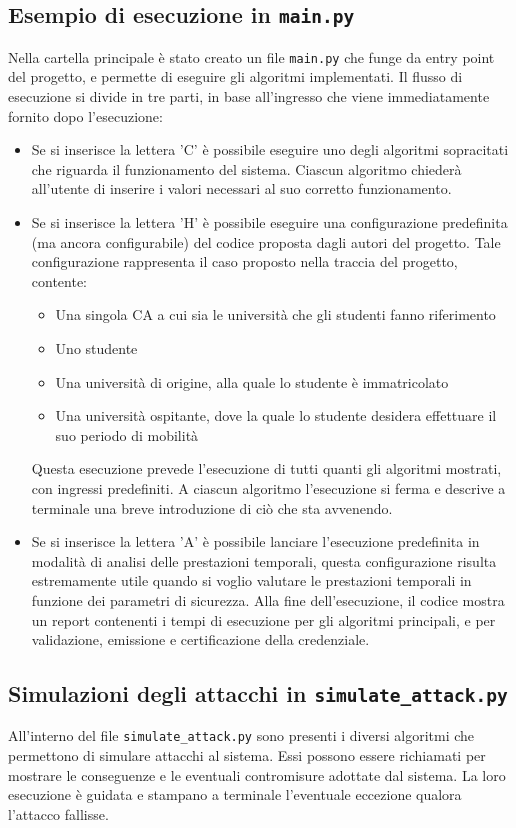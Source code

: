 \documentclass[a4paper,12pt]{article}
\begin{document}
\subsection{Esempio di esecuzione in \texttt{main.py}}
Nella cartella principale è stato creato un file \texttt{main.py} che funge da entry point del progetto, e permette di eseguire gli algoritmi implementati. Il flusso di esecuzione si divide in tre parti, in base all'ingresso che viene immediatamente fornito dopo l'esecuzione:
\begin{itemize}
    \item Se si inserisce la lettera 'C' è possibile eseguire uno degli algoritmi sopracitati che riguarda il funzionamento del sistema. Ciascun algoritmo chiederà all'utente di inserire i valori necessari al suo corretto funzionamento.
    \item Se si inserisce la lettera 'H' è possibile eseguire una configurazione predefinita (ma ancora configurabile) del codice proposta dagli autori del progetto. Tale configurazione rappresenta il caso proposto nella traccia del progetto, contente:
    \begin{itemize}
        \item Una singola CA a cui sia le università che gli studenti fanno riferimento
        \item Uno studente
        \item Una università di origine, alla quale lo studente è immatricolato
        \item Una università ospitante, dove la quale lo studente desidera effettuare il suo periodo di mobilità
    \end{itemize}
    Questa esecuzione prevede l'esecuzione di tutti quanti gli algoritmi mostrati, con ingressi predefiniti. A ciascun algoritmo l'esecuzione si ferma e descrive a terminale una breve introduzione di ciò che sta avvenendo.
    \item Se si inserisce la lettera 'A' è possibile lanciare l'esecuzione predefinita in modalità di analisi delle prestazioni temporali, questa configurazione risulta estremamente utile quando si voglio valutare le prestazioni temporali in funzione dei parametri di sicurezza. Alla fine dell'esecuzione, il codice mostra un report contenenti i tempi di esecuzione per gli algoritmi principali, e per validazione, emissione e certificazione della credenziale.
\end{itemize}
\subsection{Simulazioni degli attacchi in \texttt{simulate\_attack.py}}
All'interno del file \texttt{simulate\_attack.py} sono presenti i diversi algoritmi che permettono di simulare attacchi al sistema. Essi possono essere richiamati per mostrare le conseguenze e le eventuali contromisure adottate dal sistema. La loro esecuzione è guidata e stampano a terminale l'eventuale eccezione qualora l'attacco fallisse.
\end{document}
